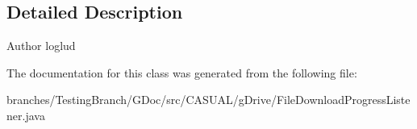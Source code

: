 \subsection{Detailed Description}
\begin{DoxyAuthor}{Author}
loglud 
\end{DoxyAuthor}


The documentation for this class was generated from the following file\-:\begin{DoxyCompactItemize}
\item 
branches/\-Testing\-Branch/\-G\-Doc/src/\-C\-A\-S\-U\-A\-L/g\-Drive/File\-Download\-Progress\-Listener.\-java\end{DoxyCompactItemize}
